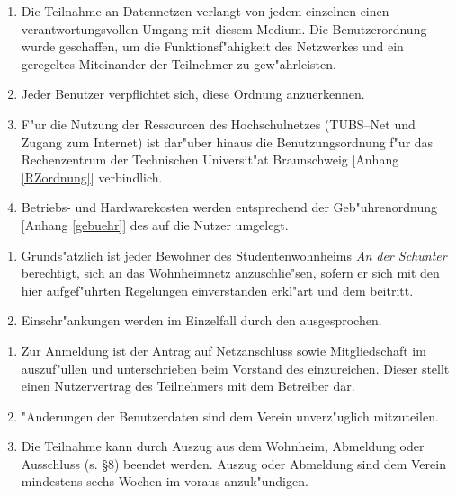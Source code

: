 \begin{enumerate}
  \item Die Teilnahme an Datennetzen verlangt von jedem einzelnen einen
      verantwortungsvollen Umgang mit diesem Medium. Die Benutzerordnung wurde
      geschaffen, um die Funktionsf"ahigkeit des Netzwerkes und ein geregeltes
      Miteinander der Teilnehmer zu gew"ahrleisten.
  \item Jeder Benutzer verpflichtet sich, diese Ordnung anzuerkennen.
  \item F"ur die Nutzung der Ressourcen des Hochschulnetzes (TUBS--Net
      und Zugang zum Internet) ist dar"uber hinaus  die
      Benutzungsordnung f"ur das Rechenzentrum der Technischen
      Universit"at Braunschweig [Anhang \ref{RZordnung}] verbindlich.
  \item Betriebs- und Hardwarekosten werden entsprechend der
      Geb"uhrenordnung [Anhang \ref{gebuehr}] des \snev auf die Nutzer
      umgelegt.
\end{enumerate}


\begin{enumerate}
  \item Grunds"atzlich ist jeder Bewohner des Studentenwohnheims
      \emph{An der Schunter} berechtigt, sich an das Wohnheimnetz
      anzuschlie"sen, sofern er sich mit den hier aufgef"uhrten
      Regelungen einverstanden erkl"art und dem \snev beitritt.
  \item Einschr"ankungen werden im Einzelfall durch den \snev ausgesprochen.
\end{enumerate}


\begin{enumerate}
  \item Zur Anmeldung ist der Antrag auf Netzanschluss sowie Mitgliedschaft
      im \snev auszuf"ullen und unterschrieben beim Vorstand des \snev
      einzureichen. Dieser stellt einen Nutzervertrag des Teilnehmers mit dem
      Betreiber dar.
  \item "Anderungen der Benutzerdaten sind dem Verein unverz"uglich
      mitzuteilen.
  \item Die Teilnahme kann durch Auszug aus dem Wohnheim, Abmeldung
      oder Ausschluss (s. \S{}8) beendet werden. Auszug oder Abmeldung sind dem
      Verein mindestens sechs Wochen im voraus anzuk"undigen.
\end{enumerate}


